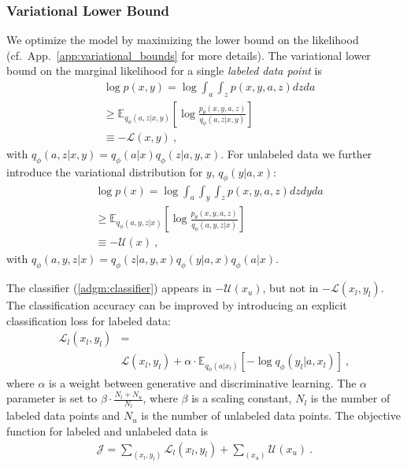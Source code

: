 \documentclass{article}
\begin{document}
\subsubsection*{Variational Lower Bound}
We optimize the model by maximizing the lower bound on the likelihood (cf.~App.~\ref{app:variational_bounds} for more details). The variational lower bound on the marginal likelihood for a single \emph{labeled data point} is
\begin{align}
&\log p(x,y) = \log \int_a \int_z p(x,y,a,z)dzda \nonumber \\
&\ge \mathbb{E}_{q_\phi(a,z|x,y)}
\left[ \log
\frac{p_\theta(x,y,a,z)}{q_\phi(a,z|x,y)} 
\right] \\
&\equiv  - \mathcal{L}(x,y)\ , \nonumber
\end{align}
with $q_\phi(a,z|x,y) = q_\phi(a|x)q_\phi(z|a,y,x)$.
For unlabeled data we further introduce the variational distribution for $y$, $q_\phi(y|a,x)$:
\begin{align}
&\log p(x) = \log \int_a \int_y \int_z p(x,y,a,z) dzdyda \nonumber \\
&\ge  \mathbb{E}_{q_\phi(a,y,z|x)}
\left[ \log
\frac{p_\theta(x,y,a,z)}{q_\phi(a,y,z|x)} 
\right]  \\
&\equiv - \mathcal{U}(x) \ , \nonumber
\end{align}
with $q_\phi(a,y,z|x) = q_\phi(z|a,y,x) q_\phi(y|a,x) q_\phi(a|x)$.

The classifier (\ref{adgm:classifier}) appears in $-\mathcal{U}(x_u)$, but not in $-\mathcal{L}(x_l,y_l)$. The classification accuracy can be improved by introducing an explicit classification loss for labeled data:
\begin{align}
\mathcal{L}_l(x_l,y_l) &=  \label{eq:elbo_trick}\\
&\mathcal{L}(x_l,y_l) + \alpha \cdot \mathbb{E}_{q_\phi(a|x_l)}[-\log q_\phi(y_l|a,x_l)] \ , \nonumber
\end{align} 
where $\alpha$ is a weight between generative and discriminative learning. The $\alpha$ parameter is set to $\beta \cdot \frac{N_l+N_u}{N_l}$, where $\beta$ is a scaling constant, $N_l$ is the number of labeled data points and $N_u$ is the number of unlabeled data points. The objective function for labeled and unlabeled data is
\begin{align}
\mathcal{J} = \sum_{(x_l,y_l)} \mathcal{L}_l(x_l,y_l) + \sum_{(x_u)} \mathcal{U}(x_u) \ .  \label{eq:elbo_col}
\end{align}
\end{document}

